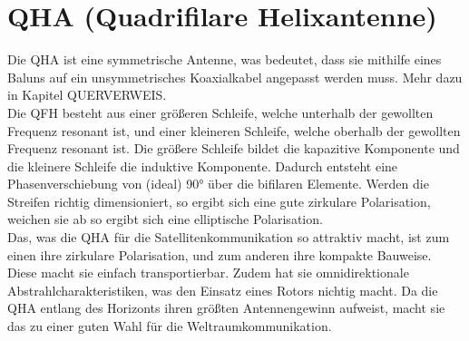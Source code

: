 \section{QHA (Quadrifilare Helixantenne)}
Die QHA ist eine symmetrische Antenne, was bedeutet, dass sie mithilfe eines Baluns auf ein unsymmetrisches Koaxialkabel angepasst werden muss. Mehr dazu in Kapitel QUERVERWEIS.\\

Die QFH besteht aus einer größeren Schleife, welche unterhalb der gewollten Frequenz resonant ist, und einer kleineren Schleife, welche oberhalb der gewollten Frequenz resonant ist. Die größere Schleife bildet die kapazitive Komponente und die kleinere Schleife die induktive Komponente. Dadurch entsteht eine Phasenverschiebung von (ideal) 90° über die bifilaren Elemente. Werden die Streifen richtig dimensioniert, so ergibt sich eine gute zirkulare Polarisation, weichen sie ab so ergibt sich eine elliptische Polarisation.\\

Das, was die QHA für die Satellitenkommunikation so attraktiv macht, ist zum einen ihre zirkulare Polarisation, und zum anderen ihre kompakte Bauweise. Diese macht sie einfach transportierbar. Zudem hat sie omnidirektionale Abstrahlcharakteristiken, was den Einsatz eines Rotors nichtig macht. Da die QHA entlang des Horizonts ihren größten Antennengewinn aufweist, macht sie das zu einer guten Wahl für die Weltraumkommunikation.
